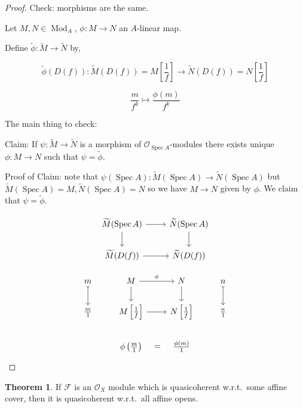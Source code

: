 \documentclass{article}
\theoremstyle{definition}
\newtheorem{theorem}{Theorem}
\begin{document}
    \begin{proof}
        Check: morphisms are the same.

        Let \(M,N \in \operatorname{Mod}_A\), \(\phi : M\to N\) an \(A\)-linear map.

        Define \(\widetilde{\phi}: \widetilde{M} \to \widetilde{N}\) by,

        \[
            \widetilde{\phi} (D(f)): \widetilde{M} (D(f)) = M \left[ \frac{1}{f} \right] \to \widetilde{N}(D(f)) = N \left[ \frac{1}{f} \right]
        \]

        \[
            \frac{m}{f^k} \mapsto \frac{\phi(m)}{f^k}
        \]

        The main thing to check: 

        Claim: If \(\psi: \widetilde{M} \to \widetilde{N}\) is a morphism of \(\mathcal{O}_{\operatorname{Spec} A}\)-modules there exists unique \(\phi: M \to N\) such that \(\psi = \widetilde{\phi}\).

        Proof of Claim: note that \(\psi (\operatorname{Spec} A): \widetilde{M} (\operatorname{Spec} A) \to \widetilde{N} (\operatorname{Spec} A)\) but \(\widetilde{M} (\operatorname{Spec} A) = M, \widetilde{N} (\operatorname{Spec} A) = N\) so we have \(M \to N\) given by \(\phi\). We claim that \(\psi = \widetilde{\phi}\).

        \[
            \begin{tikzcd}
                \widetilde{M} (\operatorname{Spec} A) \ar[r] \ar[d] & \widetilde{N} (\operatorname{Spec} A) \ar[d] \\ \widetilde{M} (D(f)) \ar[r] & \widetilde{N} (D(f))
            \end{tikzcd}
        \]

        \[
            \begin{tikzcd}
                m \ar[d, mapsto] & M \ar[r,"\phi"] \ar[d] & N \ar[d] & n \ar[d, mapsto] \\ \frac{m}{1} & M \left[ \frac{1}{f} \right] \ar[r] & N \left[ \frac{1}{f} \right] & \frac{n}{1} \\ & \phi \left( \frac{m}{1} \right) \ar[r,"=", phantom] & \frac{\phi(m)}{1}
            \end{tikzcd}
        \]
    \end{proof}

    \begin{theorem}
        If \(\mathcal{F}\) is an \(\mathcal{O}_X\) module which is quasicoherent w.r.t.\ some affine cover, then it is quasicoherent w.r.t.\ all affine opens.
    \end{theorem}
\end{document}
